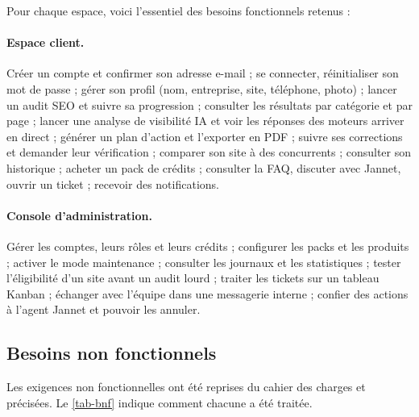
Pour chaque espace, voici l'essentiel des besoins fonctionnels retenus :

\paragraph{Espace client.}
Créer un compte et confirmer son adresse e-mail ; se connecter, réinitialiser son mot de passe ; gérer son profil (nom, entreprise, site, téléphone, photo) ; lancer un audit SEO et suivre sa progression ; consulter les résultats par catégorie et par page ; lancer une analyse de visibilité IA et voir les réponses des moteurs arriver en direct ; générer un plan d'action et l'exporter en PDF ; suivre ses corrections et demander leur vérification ; comparer son site à des concurrents ; consulter son historique ; acheter un pack de crédits ; consulter la FAQ, discuter avec Jannet, ouvrir un ticket ; recevoir des notifications.

\paragraph{Console d'administration.}
Gérer les comptes, leurs rôles et leurs crédits ; configurer les packs et les produits ; activer le mode maintenance ; consulter les journaux et les statistiques ; tester l'éligibilité d'un site avant un audit lourd ; traiter les tickets sur un tableau Kanban ; échanger avec l'équipe dans une messagerie interne ; confier des actions à l'agent Jannet et pouvoir les annuler.

\subsection{Besoins non fonctionnels}
Les exigences non fonctionnelles ont été reprises du cahier des charges et précisées. Le \cref{tab-bnf} indique comment chacune a été traitée.

